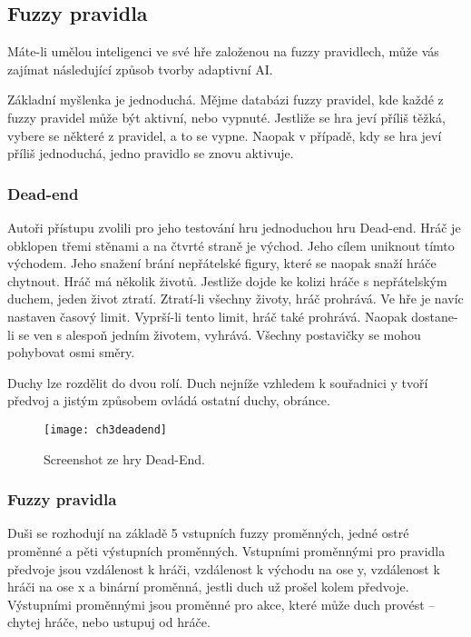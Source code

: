 \subsection{Fuzzy pravidla} \label{sec:fuzzy}

Máte-li umělou inteligenci ve své hře založenou na fuzzy pravidlech, může vás zajímat následující způsob tvorby adaptivní AI.

Základní myšlenka je jednoduchá. Mějme databázi fuzzy pravidel, kde každé z fuzzy pravidel může být aktivní, nebo vypnuté. Jestliže se hra jeví příliš těžká, vybere se některé z pravidel, a to se vypne. Naopak v případě, kdy se hra jeví příliš jednoduchá, jedno pravidlo se znovu aktivuje.

\subsubsection{Dead-end}

Autoři přístupu zvolili pro jeho testování hru jednoduchou hru Dead-end. Hráč je obklopen třemi stěnami a na čtvrté straně je východ. Jeho cílem uniknout tímto východem. Jeho snažení brání nepřátelské figury, které se naopak snaží hráče chytnout. Hráč má několik životů. Jestliže dojde ke kolizi hráče s nepřátelským duchem, jeden život ztratí. Ztratí-li všechny životy, hráč prohrává. Ve hře je navíc nastaven časový limit. Vyprší-li tento limit, hráč také prohrává. Naopak dostane-li se ven s alespoň jedním životem, vyhrává. Všechny postavičky se mohou pohybovat osmi směry.

Duchy lze rozdělit do dvou rolí. Duch nejníže vzhledem k souřadnici y tvoří předvoj a jistým způsobem ovládá ostatní duchy, obránce.

\begin{figure}
  \centering
  \texttt{[image: ch3deadend]}
	\caption{Screenshot ze hry Dead-End. \cite{25deadend} }
	\label{ch3deadend}
\end{figure}

\subsubsection{Fuzzy pravidla}

Duši se rozhodují na základě 5 vstupních fuzzy proměnných, jedné ostré proměnné a pěti výstupních proměnných.
Vstupními proměnnými pro pravidla předvoje jsou vzdálenost k hráči, vzdálenost k východu na ose y,  vzdálenost k hráči na ose x a binární proměnná, jestli duch už prošel kolem předvoje. Výstupními proměnnými jsou proměnné pro akce, které může duch provést – chytej hráče, nebo ustupuj od hráče.

